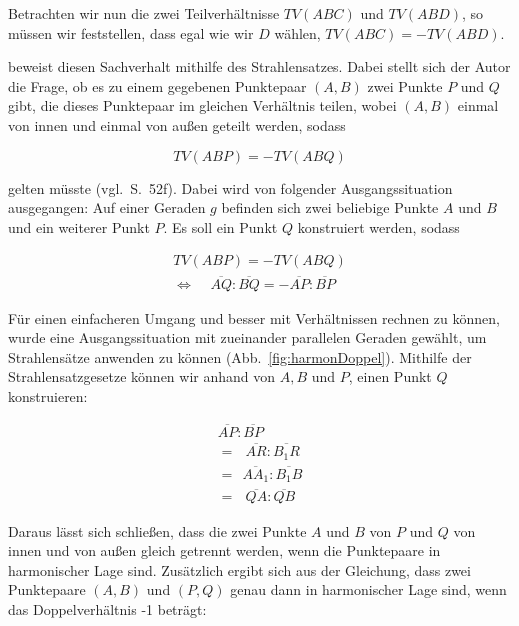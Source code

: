 \documentclass[12pt,a4paper]{article}
\begin{document}
Betrachten wir nun die zwei Teilverhältnisse $TV(A B C)$ und $TV(A B D)$, so müssen wir feststellen, dass egal wie wir $D$ wählen, $TV(A B C) = -TV(A B D)$.

\citep{projektiveGeometrie} beweist diesen Sachverhalt mithilfe des Strahlensatzes. Dabei stellt sich der Autor die Frage, ob es zu einem gegebenen Punktepaar $(A, B)$ zwei Punkte $P$ und $Q$ gibt, die dieses Punktepaar im gleichen Verhältnis teilen, wobei $(A,  B)$ einmal von innen und einmal von außen geteilt werden, sodass

\[TV(A B P) = -TV(A B Q)\]

gelten müsste (vgl.~S.~52f). Dabei wird von folgender Ausgangssituation ausgegangen: Auf einer Geraden $g$ befinden sich zwei beliebige Punkte $A$ und $B$ und ein weiterer Punkt $P$. Es soll ein Punkt $Q$ konstruiert werden, sodass 

\begin{equation*}
\begin{split}
TV(A B P) = -TV(A B Q) \\
\Longleftrightarrow ~~~~~\overline{A Q} : \overline{B Q} = -\overline{A P} : \overline{B P}~~
\end{split}
\end{equation*}

Für einen einfacheren Umgang und besser mit Verhältnissen rechnen zu können, wurde eine Ausgangssituation mit zueinander parallelen Geraden gewählt, um Strahlensätze anwenden zu können (Abb.~\ref{fig:harmonDoppel}). Mithilfe der Strahlensatzgesetze können wir anhand von $A, B$ und $P$, einen Punkt $Q$ konstruieren:

\begin{equation*}
\begin{split}
  \overline{A P} : \overline{B P}~ \\
=~~~\overline{A R} : \overline{B_1 R}  \\
=~~\overline{A A_1} : \overline{B_1 B}  \\
=~~~\overline{Q A} : \overline{Q B}~
\end{split}
\end{equation*}

Daraus lässt sich schließen, dass die zwei Punkte $A$ und $B$ von $P$ und $Q$ von innen und von außen gleich getrennt werden, wenn die Punktepaare in harmonischer Lage sind. Zusätzlich ergibt sich aus der Gleichung, dass zwei Punktepaare $(A, B)$ und $(P, Q)$ genau dann in harmonischer Lage sind, wenn das Doppelverhältnis -1 beträgt:
\end{document}
